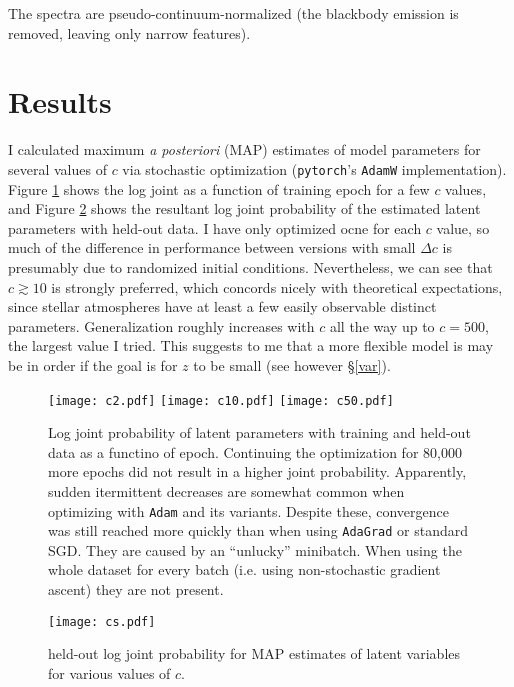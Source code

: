 \documentclass[12pt]{article}
\begin{document}
The spectra are pseudo-continuum-normalized (the blackbody emission is removed, leaving only narrow features).

\section{Results}
I calculated maximum \emph{a posteriori} (MAP) estimates of model parameters for several values of $c$ via stochastic optimization (\texttt{pytorch}'s \texttt{AdamW} implementation).
Figure \ref{training} shows the log joint as a function of training epoch for a few $c$ values, and Figure \ref{cs} shows the resultant log joint probability of the estimated latent parameters with held-out data.
I have only optimized ocne for each $c$ value, so much of the difference in performance between versions with small $\Delta c$ is presumably due to randomized initial conditions.
Nevertheless, we can see that $c \gtrsim 10$ is strongly preferred, which concords nicely with theoretical expectations, since stellar atmospheres have at least a few easily observable distinct parameters.
Generalization roughly increases with $c$ all the way up to $c=500$, the largest value I tried.  This suggests to me that a more flexible model is may be in order if the goal is for $z$ to be small (see however \S \ref{var}).

\begin{figure}
    \centering
    \texttt{[image: c2.pdf]}
    \texttt{[image: c10.pdf]}
    \texttt{[image: c50.pdf]}
    \caption{Log joint probability of latent parameters with training and held-out data as a functino of epoch. Continuing the optimization for 80,000 more epochs did not result in a higher joint probability. Apparently, sudden itermittent decreases are somewhat common when optimizing with \texttt{Adam} and its variants.  Despite these, convergence was still reached more quickly than when using \texttt{AdaGrad} or standard SGD. They are caused by an ``unlucky'' minibatch.  When using the whole dataset for every batch (i.e. using non-stochastic gradient ascent) they are not present.}
    \label{training}
\end{figure}

\begin{figure}
    \centering
    \texttt{[image: cs.pdf]}
    \caption{held-out log joint probability for MAP estimates of latent variables for various values of $c$.}
    \label{cs}
\end{figure}
\end{document}
